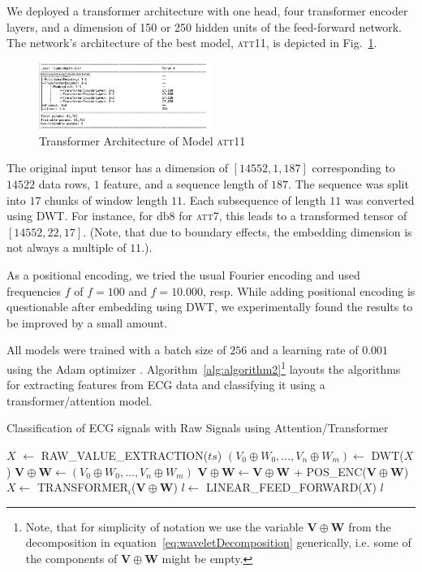 \documentclass{ieeeaccess}
\begin{document}
We deployed a transformer architecture with one head, four transformer encoder layers, and a dimension of 150 or 250 hidden units of the feed-forward network. The network's architecture of the best model, \textsc{att11}, is depicted in Fig.~\ref{fig:transformerArchitecture}.
\begin{figure}[!ht]
\includegraphics[width=0.5\textwidth]{Images/TransformerArchitecture}
\caption{Transformer Architecture of Model \textsc{att11}}
\label{fig:transformerArchitecture}
\end{figure}   

The original input tensor has a dimension of $[14552, 1, 187]$ corresponding to $14522$ data rows, $1$ feature, and a sequence length of $187$. The sequence was split into $17$ chunks of window length $11$. Each subsequence of length $11$ was converted using DWT. For instance, for db8 for \textsc{att7}, this leads to a transformed tensor of $[14552, 22, 17]$. (Note, that due to boundary effects, the embedding dimension is not always a multiple of $11$.).

As a positional encoding, we tried the usual Fourier encoding and used frequencies $f$ of $f=100$ and $f=10.000$, resp. While adding positional encoding is questionable after embedding using DWT, we experimentally found the results to be  improved by a small amount.%

All models were trained with a batch size of $256$ and a learning rate of $0.001$ using the Adam optimizer \cite{Adam}.
Algorithm~\ref{alg:algorithm2}\footnote{Note, that for simplicity of  notation we use the variable $\mathbf{V\oplus W}$ from the decomposition in equation~\ref{eq:waveletDecomposition} generically, i.e. some of the components of $\mathbf{V\oplus W}$ might be empty.} layouts the algorithms for extracting features from ECG data and classifying it using a transformer/attention model. 

\begin{algorithm}
 \caption{Classification of ECG signals with Raw Signals using Attention/Transformer}
  \label{alg:algorithm2}
 \begin{algorithmic}[1]
 \renewcommand{\algorithmicrequire}{\textbf{Input:} A time series ECG raw data $ts$}
 \renewcommand{\algorithmicensure}{\textbf{Output:} The classified label $l$}
 \REQUIRE 
 \ENSURE  

\STATE $X$ $\leftarrow$ RAW\_VALUE\_EXTRACTION($ts$)
\STATE $(V_0\oplus W_0, \ldots, V_n\oplus W_m) \leftarrow$ DWT($X$)
\STATE $\mathbf{V\oplus W} \leftarrow (V_0\oplus W_0, \ldots, V_n\oplus W_m)$
\STATE $\mathbf{V\oplus W} \leftarrow \mathbf{V\oplus W}$ + POS\_ENC($\mathbf{V\oplus W}$)
        \STATE $X \leftarrow$ TRANSFORMER$_i$($\mathbf{V\oplus W}$)
\ENDFOR
\STATE $l \leftarrow$ LINEAR\_FEED\_FORWARD($X$)
\RETURN $l$
 \end{algorithmic}
 \end{algorithm}
\end{document}
